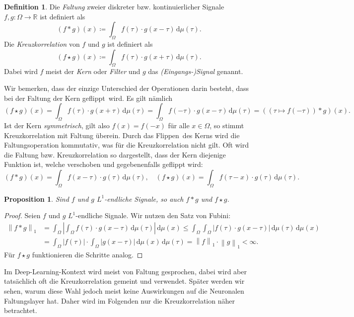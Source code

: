 \documentclass[paper=a4, 	%
		fontsize=11pt,
		abstract=true, 	%
		headsepline, 	%
		notitlepage	%
		]{scrartcl}
\newtheorem{proposition}[theorem]{Proposition}
\theoremstyle{definition}
\newtheorem{definition}[theorem]{Definition}
\newcommand{\R}{\mathbb{R}}
\newcommand{\diff}{\,\textrm{d}}
\newcommand{\todo}[1]{{\color{red} #1}}
\newcommand{\norm}[1]{\left\lVert#1\right\rVert}
\newcommand{\abs}[1]{\left\lvert#1\right\rvert}
\begin{document}
\begin{definition}
    Die \emph{Faltung} zweier diskreter bzw. kontinuierlicher Signale $f,g: \Omega\rightarrow \R$ ist definiert als 
    \[
        (f * g)(x) \coloneqq \int_\Omega f(\tau) \cdot g(x-\tau) \diff \mu(\tau).
    \]
    Die \emph{Kreuzkorrelation} von $f$ und $g$ ist definiert als
    \[
        (f \star g)(x) \coloneqq \int_\Omega f(\tau) \cdot g(x+\tau) \diff \mu(\tau).
    \]
    Dabei wird $f$ meist der \emph{Kern} oder \emph{Filter} und $g$ das \emph{(Eingangs-)Signal} genannt.
\end{definition}

Wir bemerken, dass der einzige Unterschied der Operationen darin besteht, dass bei der Faltung der Kern \glqq geflippt\grqq\ wird.
Es gilt nämlich \[
    \left(f \star g\right)(x) = \int_{\Omega} f(\tau) \cdot g(x+\tau) \diff\mu(\tau) = \int_\Omega f(-\tau) \cdot g(x - \tau) \diff\mu(\tau) = \left((\tau\mapsto f(-\tau)) * g\right)(x).
\]
Ist der Kern \emph{symmetrisch}, gilt also $f(x) = f(-x)$ für alle $x\in\Omega$, so stimmt Kreuzkorrelation mit Faltung überein.
Durch das \glqq Flippen\grqq\ des Kerns wird die Faltungsoperation kommutativ, was für die Kreuzkorrelation nicht gilt.
Oft wird die Faltung bzw. Kreuzkorrelation so dargestellt, dass der Kern diejenige Funktion ist, welche verschoben und gegebenenfalls geflippt wird:
\[
    (f*g)(x) = \int_\Omega f(x - \tau) \cdot g(\tau)\diff\mu(\tau), \quad
    (f\star g)(x) = \int_\Omega f(\tau - x) \cdot g(\tau) \diff\mu(\tau).
\]

\begin{proposition}
    Sind $f$ und $g$ $L^1$-endliche Signale, so auch $f * g$ und $f\star g$.
\end{proposition}
\begin{proof}
    Seien $f$ und $g$ $L^1$-endliche Signale. Wir nutzen den Satz von Fubini:
    \begin{align*}
        \norm{f * g}_1
        &= \int_{\Omega} \abs{ \int_\Omega f(\tau)\cdot g(x - \tau) \diff\mu(\tau) }\diff \mu(x)
        \leq \int_{\Omega}  \int_{\Omega} \abs{f(\tau)\cdot g(x - \tau)} \diff\mu(\tau) \diff \mu(x)\\
        &= \int_{\Omega} \abs{f(\tau)} \cdot \int_{\Omega} \abs{g(x-\tau)} \diff \mu(x) \diff\mu(\tau)
        = \norm{f}_1 \cdot \norm{g}_1 < \infty.
    \end{align*}
    Für $f \star g$ funktionieren die Schritte analog.
\end{proof}

Im Deep-Learning-Kontext wird meist von Faltung gesprochen, dabei wird aber tat\-säch\-lich oft die Kreuzkorrelation gemeint und verwendet.
\todo{Später werden wir sehen, warum diese Wahl jedoch meist keine Auswirkungen auf die Neuronalen Faltungslayer hat.}
Daher wird im Folgenden nur die Kreuzkorrelation näher betrachtet.
\end{document}
